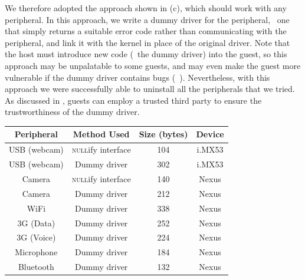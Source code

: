 We therefore adopted the approach shown in (c), which
should work with any peripheral. In this approach, we write a dummy driver for
the peripheral, \eg~one that simply returns a suitable error code rather than
communicating with the peripheral, and link it with the kernel in place of the
original driver. Note that the host must introduce new code (\ie~the dummy
driver) into the guest, so this approach may be unpalatable to some guests, and
may even make the guest more vulnerable if the dummy driver contains bugs
(\eg~\cite{sonydrm:sec06}). Nevertheless, with this approach we were
successfully able to uninstall all the peripherals that we tried. As discussed
in , guests can employ a trusted third
party to ensure the trustworthiness of the dummy driver. 

\begin{table}[t!]
\footnotesize
\centering
\begin{tabular}{|c|c|c|c|}
\hline
\textbf{Peripheral} 
  & \textbf{Method Used} 
  & \textbf{Size (bytes)} 
  & \textbf{Device}\\
\hline
USB (webcam) & \textsc{null}ify interface & 104 & i.MX53\\
USB (webcam) & Dummy driver               & 302 & i.MX53\\
Camera       & \textsc{null}ify interface & 140 & Nexus\\
Camera       & Dummy driver               & 212 & Nexus\\
WiFi         & Dummy driver               & 338 & Nexus\\
3G (Data)    & Dummy driver               & 252 & Nexus\\
3G (Voice)   & Dummy driver               & 224 & Nexus\\
Microphone   & Dummy driver               & 184 & Nexus\\
Bluetooth    & Dummy driver               & 132 & Nexus\\
\hline
\end{tabular}
{\label{table:uninstall}}
\end{table}

